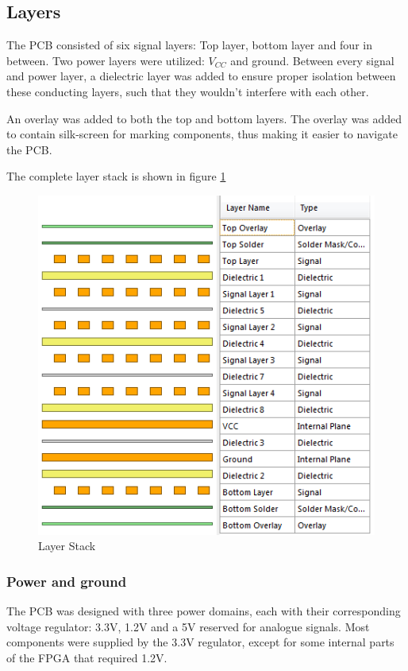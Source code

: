 \subsection{Layers}
The PCB consisted of six signal layers: Top layer, bottom layer and four in between.
Two power layers were utilized: \(V_{CC}\) and ground.
Between every signal and power layer, a dielectric layer was added to ensure proper isolation between these conducting layers, such that they wouldn't interfere with each other.

An overlay was added to both the top and bottom layers.
The overlay was added to contain silk-screen for marking components, thus making it easier to navigate the PCB.

The complete layer stack is shown in figure \ref{fig:Layers}

\begin{figure}[h!]
\centering
\includegraphics[scale = 0.8]{images/Layers.png}
\caption{Layer Stack}
\label{fig:Layers}
\end{figure}

\subsubsection{Power and ground}
\label{Power}
The PCB was designed with three power domains, each with their corresponding voltage regulator: 3.3V, 1.2V and a 5V reserved for analogue signals.
Most components were supplied by the 3.3V regulator, except for some internal parts of the FPGA that required 1.2V.

